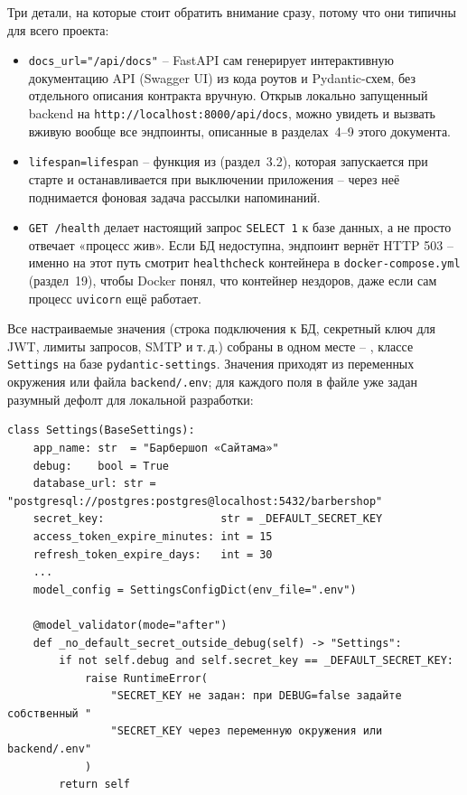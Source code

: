 Три детали, на которые стоит обратить внимание сразу, потому что они
типичны для всего проекта:

\begin{itemize}
  \item \texttt{docs_url="/api/docs"} -- FastAPI сам генерирует
        интерактивную документацию API (Swagger UI) из кода роутов и
        Pydantic-схем, без отдельного описания контракта вручную. Открыв
        локально запущенный backend на \texttt{http://localhost:8000/api/docs},
        можно увидеть и вызвать вживую вообще все эндпоинты, описанные в
        разделах~4--9 этого документа.
  \item \texttt{lifespan=lifespan} -- функция из
         (раздел~3.2), которая
        запускается при старте и останавливается при выключении
        приложения -- через неё поднимается фоновая задача рассылки
        напоминаний.
  \item \texttt{GET /health} делает настоящий запрос \texttt{SELECT 1} к
        базе данных, а не просто отвечает «процесс жив». Если БД
        недоступна, эндпоинт вернёт HTTP 503 -- именно на этот путь
        смотрит \texttt{healthcheck} контейнера в
        \texttt{docker-compose.yml} (раздел~19), чтобы Docker понял, что
        контейнер нездоров, даже если сам процесс \texttt{uvicorn} ещё
        работает.
\end{itemize}

Все настраиваемые значения (строка подключения к БД, секретный ключ для
JWT, лимиты запросов, SMTP и т.\,д.) собраны в одном месте --
, классе \texttt{Settings} на базе
\texttt{pydantic-settings}. Значения приходят из переменных окружения или
файла \texttt{backend/.env}; для каждого поля в файле уже задан
разумный дефолт для локальной разработки:

\begin{verbatim}
class Settings(BaseSettings):
    app_name: str  = "Барбершоп «Сайтама»"
    debug:    bool = True
    database_url: str = "postgresql://postgres:postgres@localhost:5432/barbershop"
    secret_key:                  str = _DEFAULT_SECRET_KEY
    access_token_expire_minutes: int = 15
    refresh_token_expire_days:   int = 30
    ...
    model_config = SettingsConfigDict(env_file=".env")

    @model_validator(mode="after")
    def _no_default_secret_outside_debug(self) -> "Settings":
        if not self.debug and self.secret_key == _DEFAULT_SECRET_KEY:
            raise RuntimeError(
                "SECRET_KEY не задан: при DEBUG=false задайте собственный "
                "SECRET_KEY через переменную окружения или backend/.env"
            )
        return self
\end{verbatim}

